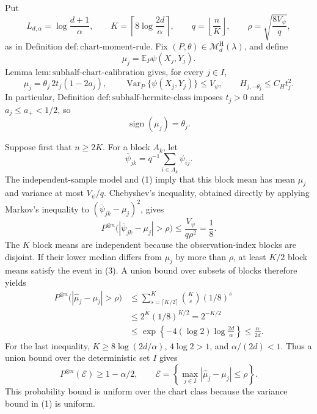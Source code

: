 Put
\[
L_{d,\alpha}=\log\frac{d+1}{\alpha},\qquad
K=\left\lceil 8\log\frac{2d}{\alpha}\right\rceil,
\qquad q=\left\lfloor\frac nK\right\rfloor,
\qquad \rho=\sqrt{\frac{8V_\psi}{q}},
\]
as in Definition \(\mathrm{def:chart\text{-}moment\text{-}rule}\).  Fix
\((P,\theta)\in\mathcal M_d^{\mathrm H}(\lambda)\), and define
\[
\mu_j=\mathbb E_P\psi(X_j,Y_j).
\]
Lemma \(\mathrm{lem:subhalf\text{-}chart\text{-}calibration}\) gives, for every \(j\in I\),
\[
\mu_j=\theta_j\,2t_j(1-2a_j),
\qquad
\operatorname{Var}_P\{\psi(X_j,Y_j)\}\le V_\psi,
\qquad
H_{j,-\theta_j}\le C_Ht_j^2.
\tag{1}
\]
In particular, Definition \(\mathrm{def:subhalf\text{-}hermite\text{-}class}\) imposes \(t_j>0\) and \(a_j\le a_+<1/2\), so
\[
\operatorname{sign}(\mu_j)=\theta_j.
\tag{2}
\]

Suppose first that \(n\ge2K\).  For a block \(A_k\), let
\[
\overline\psi_{jk}=q^{-1}\sum_{i\in A_k}\psi_{ij}.
\]
The independent-sample model and (1) imply that this block mean has mean \(\mu_j\) and variance at most \(V_\psi/q\).  Chebyshev's inequality, obtained directly by applying Markov's inequality to \((\overline\psi_{jk}-\mu_j)^2\), gives
\[
P^{\otimes n}\bigl(|\overline\psi_{jk}-\mu_j|>\rho\bigr)
\le \frac{V_\psi}{q\rho^2}=\frac18.
\tag{3}
\]
The \(K\) block means are independent because the observation-index blocks are disjoint.  If their lower median differs from \(\mu_j\) by more than \(\rho\), at least \(K/2\) block means satisfy the event in (3).  A union bound over subsets of blocks therefore yields
\[
\begin{aligned}
P^{\otimes n}\bigl(|\widehat\mu_j-\mu_j|>\rho\bigr)
&\le \sum_{s=\lceil K/2\rceil}^{K}\binom Ks(1/8)^s\\
&\le 2^K(1/8)^{K/2}
=2^{-K/2}\\
&\le \exp\left\{-4(\log2)\log\frac{2d}{\alpha}\right\}
\le \frac{\alpha}{2d}.
\end{aligned}
\tag{4}
\]
For the last inequality, \(K\ge8\log(2d/\alpha)\), \(4\log2>1\), and \(\alpha/(2d)<1\).  Thus a union bound over the deterministic set \(I\) gives
\[
P^{\otimes n}(\mathcal E)\ge1-\alpha/2,
\qquad
\mathcal E=\left\{\max_{j\in I}|\widehat\mu_j-\mu_j|\le\rho\right\}.
\tag{5}
\]
This probability bound is uniform over the chart class because the variance bound in (1) is uniform.

